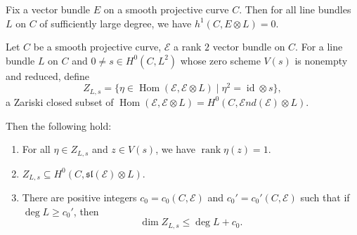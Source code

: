 \documentclass[10pt,a4paper]{amsart}
\begin{document}
\begin{lemma}\label{Serre}
Fix a vector bundle $E$ on a smooth projective curve $C$. Then for all line bundles $L$ on $C$ of sufficiently large degree, we have
$h^1(C,E\otimes L)=0$.
\end{lemma}

\begin{lemma}\label{zls}
Let $C$ be a smooth projective curve, $\mathcal{E}$ a rank $2$ vector bundle on $C$. For a line bundle $L$ on $C$ and $0\neq s\in H^0(C,L^2)$ whose zero scheme $V(s)$ is nonempty and reduced, define
\[
Z_{L,s}=\{\eta\in\operatorname{Hom}(\mathcal{E},\mathcal{E}\otimes L)\mid \eta^2=\operatorname{id}\otimes s\},
\]
a Zariski closed subset of $\operatorname{Hom}(\mathcal{E},\mathcal{E}\otimes L)=H^0(C,\mathcal{E}nd(\mathcal{E})\otimes L)$.

Then the following hold:

\begin{enumerate}
\item For all $\eta\in Z_{L,s}$ and $z\in V(s)$, we have $\operatorname{rank}\eta(z)=1$.

\item $Z_{L,s}\subseteq H^0(C,\mathfrak{sl}(\mathcal{E})\otimes L)$.

\item There are positive integers $c_0=c_0(C,\mathcal{E})$ and $c_0'=c_0'(C,\mathcal{E})$ such that if $\deg L\ge c_0'$, then
\[
\dim Z_{L,s}\le \deg L+c_0.
\]
\end{enumerate}
\end{lemma}
\end{document}
